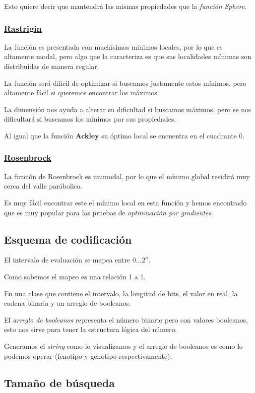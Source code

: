\documentclass{article}
\begin{document}
Esto quiere decir que mantendrá las mismas propiedades que la \textit{función Sphere}.

\subsubsection*{\href{https://www.sfu.ca/~ssurjano/rastr.html}{Rastrigin}}
La función es presentada con muchísimos minimos locales, por lo que es altamente modal, pero algo que la caracteriza es que sus localidades
mínimas son distribuidas de manera regular.

La función será dificil de optimizar si buscamos justamente estos mínimos, pero altamente fácil si queremos encontrar los máximos.

La dimensión nos ayuda a alterar su dificultad si buscamos máximos, pero se nos dificultará si buscamos los mínimos por sus propiedades.

Al igual que la función \textbf{Ackley} su óptimo local se encuentra en el cuadrante 0.

\subsubsection*{\href{https://www.sfu.ca/~ssurjano/rosen.html}{Rosenbrock}}
La función de Rosenbrock es unimodal, por lo que el mínimo global residirá muy cerca del valle parábolico.

Es muy fácil encontrar este el mínimo local en esta función y hemos encontrado que es muy popular para las pruebas
de \textit{optimización por gradientes}.

\subsection*{Esquema de codificación}
El intervalo de evaluación se mapea entre $0 \dots 2^n$.

Como sabemos el mapeo es una relación 1 a 1.

En una clase que contiene el intervalo, la longitud de bits, el valor en real, la cadena binaria y un arreglo de booleanos.

El \textit{arreglo de booleanos} representa el número binario pero con valores booleanos, esto nos sirve para tener la estructura lógica del número.

Generamos el \textit{string} como lo visualizamos y el arreglo de booleanos es como lo podemos operar (fenotipo y genotipo respectivamente).

\subsection*{Tamaño de búsqueda}
\end{document}
